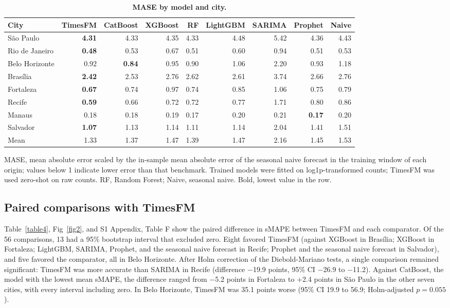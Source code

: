 \documentclass[10pt,letterpaper]{article}
\begin{document}

\begin{table}[!ht]
\centering
\small
\caption{\textbf{MASE by model and city.}}
\begin{tabular}{lrrrrrrrr}
\toprule
City & TimesFM & CatBoost & XGBoost & RF & LightGBM & SARIMA & Prophet & Naive \\
\midrule
S\~ao Paulo & \textbf{4.31} & 4.33 & 4.35 & 4.33 & 4.48 & 5.42 & 4.36 & 4.43 \\
Rio de Janeiro & \textbf{0.48} & 0.53 & 0.67 & 0.51 & 0.60 & 0.94 & 0.51 & 0.53 \\
Belo Horizonte & 0.92 & \textbf{0.84} & 0.95 & 0.90 & 1.06 & 2.20 & 0.93 & 1.18 \\
Bras\'ilia & \textbf{2.42} & 2.53 & 2.76 & 2.62 & 2.61 & 3.74 & 2.66 & 2.76 \\
Fortaleza & \textbf{0.67} & 0.74 & 0.97 & 0.74 & 0.85 & 1.06 & 0.75 & 0.79 \\
Recife & \textbf{0.59} & 0.66 & 0.72 & 0.72 & 0.77 & 1.71 & 0.80 & 0.86 \\
Manaus & 0.18 & 0.18 & 0.19 & 0.17 & 0.20 & 0.21 & \textbf{0.17} & 0.20 \\
Salvador & \textbf{1.07} & 1.13 & 1.14 & 1.11 & 1.14 & 2.04 & 1.41 & 1.51 \\
\midrule
Mean & 1.33 & 1.37 & 1.47 & 1.39 & 1.47 & 2.16 & 1.45 & 1.53 \\
\bottomrule
\end{tabular}
\begin{flushleft} MASE, mean absolute error scaled by the in-sample mean absolute error of the seasonal naive forecast in the training window of each origin; values below 1 indicate lower error than that benchmark. Trained models were fitted on log1p-transformed counts; TimesFM was used zero-shot on raw counts. RF, Random Forest; Naive, seasonal naive. Bold, lowest value in the row.
\end{flushleft}
\label{table3}
\end{table}


\subsection*{Paired comparisons with TimesFM}
Table~\ref{table4}, Fig~\ref{fig2}, and S1 Appendix, Table F show the paired difference in sMAPE between TimesFM and each comparator. Of the 56 comparisons, 13 had a 95\% bootstrap interval that excluded zero. Eight favored TimesFM (against XGBoost in Bras\'ilia; XGBoost in Fortaleza; LightGBM, SARIMA, Prophet, and the seasonal naive forecast in Recife; Prophet and the seasonal naive forecast in Salvador), and five favored the comparator, all in Belo Horizonte. After Holm correction of the Diebold-Mariano tests, a single comparison remained significant: TimesFM was more accurate than SARIMA in Recife (difference $-$19.9 points, 95\% CI $-$26.9 to $-$11.2). Against CatBoost, the model with the lowest mean sMAPE, the difference ranged from $-$5.2 points in Fortaleza to +2.4 points in S\~ao Paulo in the other seven cities, with every interval including zero. In Belo Horizonte, TimesFM was 35.1 points worse (95\% CI 19.9 to 56.9; Holm-adjusted $p = 0.055$).
\end{document}
